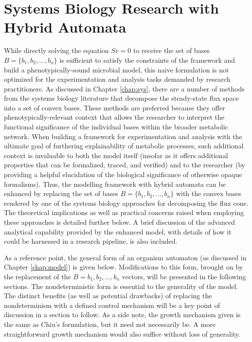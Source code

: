 
\chapter{Systems Biology Research with Hybrid Automata}\label{chap:research}

While directly solving the equation $Sv = 0$ to receive the set of bases $B = \{ b_1, b_2, ..., b_n \}$ is sufficient to satisfy the constraints of the framework and build a phenotypically-sound microbial model, this naive formulation is not optimized for the experimentation and analysis tasks demanded by research practitioners. As discussed in Chapter \ref{chap:sys}, there are a number of methods from the systems biology literature that decompose the steady-state flux space into a set of convex bases. These methods are preferred because they offer phenotypically-relevant context that allows the researcher to interpret the functional significance of the individual bases within the broader metabolic network. When building a framework for experimentation and analysis with the ultimate goal of furthering explainability of metabolic processes, such additional context is invaluable to both the model itself (insofar as it offers additional properties that can be formalized, traced, and verified) and to the researcher (by providing a helpful elucidation of the biological significance of otherwise opaque formalisms). Thus, the modelling framework with hybrid automata can be enhanced by replacing the set of bases $B = \{ b_1, b_2, ..., b_n \}$ with the convex bases rendered by one of the systems biology approaches for decomposing the flux cone. The theoretical implications as well as practical concerns raised when employing these approaches is detailed further below. A brief discussion of the advanced analytical capability provided by the enhanced model, with details of how it could be harnessed in a research pipeline, is also included.

As a reference point, the general form of an organism automaton (as discussed in Chapter \ref{chap:model}) is given below. Modifications to this form, brought on by the replacement of the $B = b_1, b_2, ..., b_n$ vectors, will be presented in the following sections. The nondeterministic form is essential to the generality of the model. The distinct benefits (as well as potential drawbacks) of replacing the nondeterminism with a defined control mechanism will be a key point of discussion in a section to follow. As a side note, the growth mechanism given is the same as Chiu's formulation, but it need not necessarily be. A more straightforward growth mechanism would also suffice without loss of generality. 

